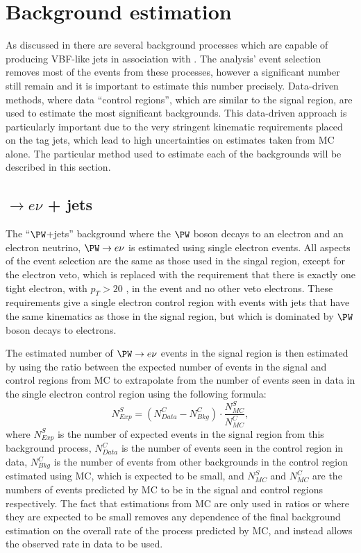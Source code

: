 \section{Background estimation}%
\label{sec:promptbkg}
As discussed in  there are several background processes which are capable of producing VBF-like jets in association with \MET. The analysis' event selection removes most of the events from these processes, however a significant number still remain and it is important to estimate this number precisely. Data-driven methods, where data ``control regions'', which are similar to the signal region, are used to estimate the most significant backgrounds. This data-driven approach is particularly important due to the very stringent kinematic requirements placed on the tag jets, which lead to high uncertainties on estimates taken from \ac{MC} alone. The particular method used to estimate each of the backgrounds will be described in this section.

\subsection{\PW$\rightarrow e\nu$ + jets}%
\label{sec:promptwenu}
The ``$\PW$+jets'' background where the $\PW$ boson decays to an electron and an electron neutrino, $\PW\rightarrow e\nu$ is estimated using single electron events. All aspects of the event selection are the same as those used in the singal region, except for the electron veto, which is replaced with the requirement that there is exactly one tight electron, with $p_{T}>20$ \GeV, in the event and no other veto electrons. These requirements give a single electron control region with events with jets that have the same kinematics as those in the signal region, but which is dominated by $\PW$ boson decays to electrons.

The estimated number of $\PW\rightarrow e\nu$ events in the signal region is then estimated by using the ratio between the expected number of events in the signal and control regions from \ac{MC} to extrapolate from the number of events seen in data in the single electron control region using the following formula:
\begin{equation}
  \label{eq:wdatabkg}
  N^{S}_{Exp}=\left(N^{C}_{Data}-N^{C}_{Bkg}\right)\cdot\frac{N^{S}_{MC}}{N^{C}_{MC}},
\end{equation}
where $N^{S}_{Exp}$ is the number of expected events in the signal region from this background process, $N^{C}_{Data}$ is the number of events seen in the control region in data, $N^{C}_{Bkg}$ is the number of events from other backgrounds in the control region estimated using \ac{MC}, which is expected to be small, and $N^{S}_{MC}$ and $N^{C}_{MC}$ are the numbers of events predicted by \ac{MC} to be in the signal and control regions respectively. The fact that estimations from \ac{MC} are only used in ratios or where they are expected to be small removes any dependence of the final background estimation on the overall rate of the process predicted by \ac{MC}, and instead allows the observed rate in data to be used.

